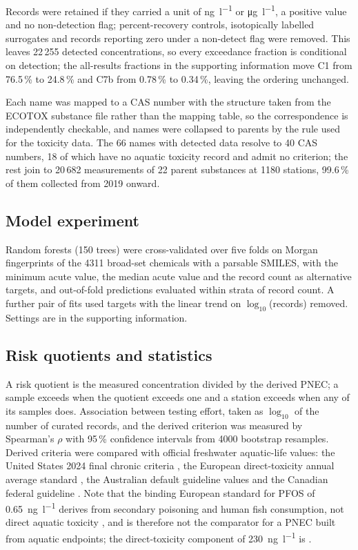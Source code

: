 \documentclass[preprint,12pt]{elsarticle}
\begin{document}
Records were retained if they carried a unit of \si{\nano\gram\per\litre} or
\si{\micro\gram\per\litre}, a positive value and no non-detection flag;
percent-recovery controls, isotopically labelled surrogates and records
reporting zero under a non-detect flag were removed. This leaves 22\,255
detected concentrations, so every exceedance fraction is conditional on
detection; the all-results fractions in the supporting information move C1
from 76.5\,\% to 24.8\,\% and C7b from 0.78\,\% to 0.34\,\%, leaving the
ordering unchanged.

Each name was mapped to a CAS number with the structure taken from the ECOTOX
substance file rather than the mapping table, so the correspondence is
independently checkable, and names were collapsed to parents by the rule used
for the toxicity data. The 66 names with detected data resolve to 40 CAS
numbers, 18 of which have no aquatic toxicity record and admit no criterion;
the rest join to 20\,682 measurements of 22 parent substances at 1180
stations, 99.6\,\% of them collected from 2019 onward.

\subsection{Model experiment}

Random forests (150 trees) were cross-validated over five folds on Morgan
fingerprints of the 4311 broad-set chemicals with a parsable SMILES, with the
minimum acute value, the median acute value and the record count as alternative
targets, and out-of-fold predictions evaluated within strata of record count. A
further pair of fits used targets with the linear trend on $\log_{10}$(records)
removed. Settings are in the supporting information.

\subsection{Risk quotients and statistics}

A risk quotient is the measured concentration divided by the derived PNEC; a
sample exceeds when the quotient exceeds one and a station exceeds when any of
its samples does. Association between testing effort, taken as $\log_{10}$ of
the number of curated records, and the derived criterion was measured by
Spearman's $\rho$ with 95\,\% confidence intervals from 4000 bootstrap
resamples. Derived criteria were compared with official freshwater
aquatic-life values: the United States 2024 final chronic criteria
\cite{epa2024pfosalc, epa2024pfoaalc}, the European direct-toxicity annual
average standard \cite{eu2013directive, ruffle2024criteria}, the Australian
default guideline values \cite{anzg2018pfos} and the Canadian federal guideline
\cite{eccc2018feqgpfos}. Note that the binding European standard for PFOS of
\SI{0.65}{\nano\gram\per\litre} derives from secondary poisoning and human fish
consumption, not direct aquatic toxicity \cite{eu2013directive}, and is
therefore not the comparator for a PNEC built from aquatic endpoints; the
direct-toxicity component of \SI{230}{\nano\gram\per\litre} is
\cite{ruffle2024criteria}.
\end{document}
